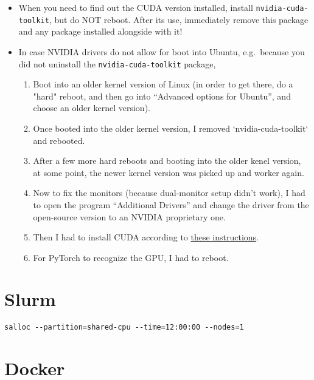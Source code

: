 \documentclass[12pt, a4paper]{scrbook}
\numberwithin{equation}{section}
\theoremstyle{definition}
\theoremstyle{definition}
\begin{document}
	\begin{itemize}
		\item When you need to find out the CUDA version installed, install \texttt{nvidia-cuda-toolkit}, but do NOT reboot. After its use, immediately remove this package and any package installed alongside with it!
		
		\item In case NVIDIA drivers do not allow for boot into Ubuntu, e.g.~because you did not uninstall the \texttt{nvidia-cuda-toolkit} package,
		
		\begin{enumerate}
			\item Boot into an older kernel version of Linux (in order to get there, do a "hard" reboot, and then go into 
			\enquote{Advanced options for Ubuntu}, and choose an older kernel version). 
			\item Once booted into the older kernel version, I removed `nvidia-cuda-toolkit` and rebooted. 
			\item After a few more hard reboots and booting into the older kenel version, at some point, the newer kernel 
			version was picked up and worker again. 
			\item Now to fix the monitors (because dual-monitor setup didn't work), I had to open the program 
			\enquote{Additional Drivers} and change the driver from the open-source version to an NVIDIA proprietary one. 
			\item Then I had to install CUDA according to \href{https://docs.nvidia.com/cuda/cuda-installation-guide-linux/index.html}{these instructions}. 
			\item For PyTorch to recognize the GPU, I had to reboot. 
		\end{enumerate}
		
	\end{itemize}

	\chapter{Slurm}
	
	\begin{lstlisting}[style=mystylebash, xleftmargin=\parindent]
		salloc --partition=shared-cpu --time=12:00:00 --nodes=1
	\end{lstlisting}
	
	\chapter{Docker}
	
\end{document}
